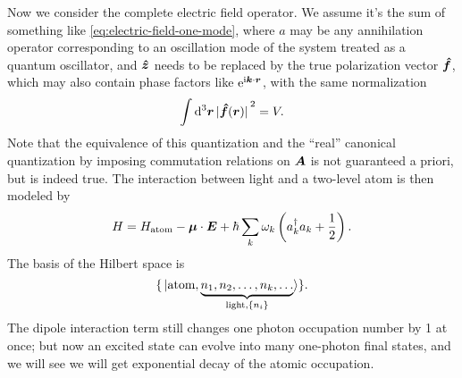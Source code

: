 \documentclass[hyperref, a4paper]{article}
\newcommand*{\ii}{\mathrm{i}}
\newcommand*{\ee}{\mathrm{e}}
\begin{document}
Now we consider the complete electric field operator.
We assume it's the sum of something like \eqref{eq:electric-field-one-mode},
where $a$ may be any annihilation operator 
corresponding to an oscillation mode of the system 
treated as a quantum oscillator,
and $\vu*{z}$ needs to be replaced by the true polarization vector $\vu*{f}$, 
which may also contain phase factors like $\ee^{\ii \vb*{k} \cdot \vb*{r}}$,
with the same normalization
\begin{equation}
    \int \dd[3]{\vb*{r}} \abs*{\vu*{f}(\vb*{r})}^2 = V.
\end{equation} 
Note that the equivalence of this quantization 
and the ``real'' canonical quantization 
by imposing commutation relations on $\vb*{A}$ 
is not guaranteed a priori, but is indeed true.
The interaction between light and a two-level atom is then modeled by 
\begin{equation}
    H = H_{\text{atom}} - \vb*{\mu} \cdot \vb*{E} + \hbar  \sum_k \omega_k \left(
        a^\dagger_k a_k + \frac{1}{2}
    \right).
\end{equation}
The basis of the Hilbert space is 
\begin{equation}
    \{
        \ket*{
            \text{atom}, \underbrace{
                n_1, n_2, \ldots, n_k, \ldots
            }_{\text{light}, \{n_i\}} 
        }
    \}.
\end{equation}
The dipole interaction term still 
changes one photon occupation number by 1 at once; 
but now an excited state can evolve into many 
one-photon final states, 
and we will see we will get exponential decay 
of the atomic occupation. 
\end{document}
